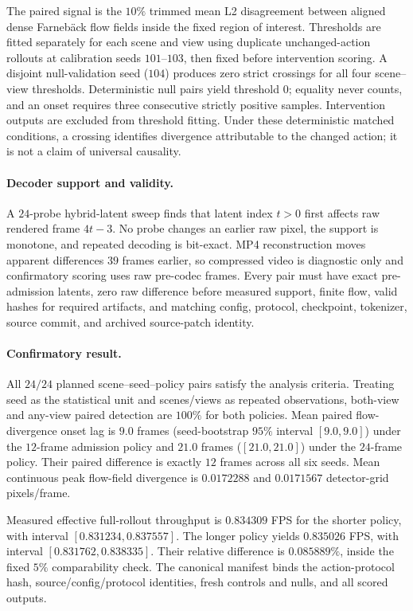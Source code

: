 \documentclass[11pt]{article}
\begin{document}
The paired signal is the $10\%$ trimmed mean L2 disagreement between aligned dense Farneb\"ack flow fields inside the fixed region of interest. Thresholds are fitted separately for each scene and view using duplicate unchanged-action rollouts at calibration seeds $101$--$103$, then fixed before intervention scoring. A disjoint null-validation seed ($104$) produces zero strict crossings for all four scene--view thresholds. Deterministic null pairs yield threshold $0$; equality never counts, and an onset requires three consecutive strictly positive samples. Intervention outputs are excluded from threshold fitting. Under these deterministic matched conditions, a crossing identifies divergence attributable to the changed action; it is not a claim of universal causality.

\paragraph{Decoder support and validity.}
A $24$-probe hybrid-latent sweep finds that latent index $t>0$ first affects raw rendered frame $4t-3$. No probe changes an earlier raw pixel, the support is monotone, and repeated decoding is bit-exact. MP4 reconstruction moves apparent differences $39$ frames earlier, so compressed video is diagnostic only and confirmatory scoring uses raw pre-codec frames. Every pair must have exact pre-admission latents, zero raw difference before measured support, finite flow, valid hashes for required artifacts, and matching config, protocol, checkpoint, tokenizer, source commit, and archived source-patch identity.

\paragraph{Confirmatory result.}
All $24/24$ planned scene--seed--policy pairs satisfy the analysis criteria. Treating seed as the statistical unit and scenes/views as repeated observations, both-view and any-view paired detection are $100\%$ for both policies. Mean paired flow-divergence onset lag is $9.0$ frames (seed-bootstrap $95\%$ interval $[9.0,9.0]$) under the $12$-frame admission policy and $21.0$ frames ($[21.0,21.0]$) under the $24$-frame policy. Their paired difference is exactly $12$ frames across all six seeds. Mean continuous peak flow-field divergence is $0.0172288$ and $0.0171567$ detector-grid pixels/frame.

Measured effective full-rollout throughput is $0.834309$ FPS for the shorter policy, with interval $[0.831234,0.837557]$. The longer policy yields $0.835026$ FPS, with interval $[0.831762,0.838335]$. Their relative difference is $0.085889\%$, inside the fixed $5\%$ comparability check. The canonical manifest binds the action-protocol hash, source/config/protocol identities, fresh controls and nulls, and all scored outputs.
\end{document}
